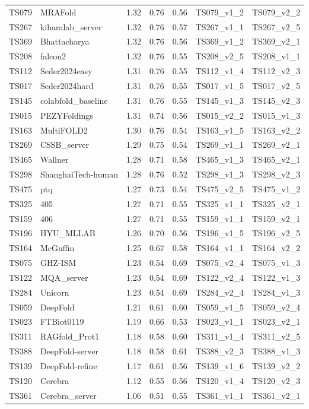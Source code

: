 \begin{table}[ht]
{\begin{tabular}{llrrrll}
TS079 & MRAFold & 1.32 & 0.76 & 0.56 & TS079\_v1\_2 & TS079\_v2\_2 \\ 
TS267 & kiharalab\_server & 1.32 & 0.76 & 0.57 & TS267\_v1\_1 & TS267\_v2\_5 \\ 
TS369 & Bhattacharya & 1.32 & 0.76 & 0.56 & TS369\_v1\_2 & TS369\_v2\_1 \\ 
TS208 & falcon2 & 1.32 & 0.76 & 0.55 & TS208\_v2\_5 & TS208\_v1\_1 \\ 
TS112 & Seder2024easy & 1.31 & 0.76 & 0.55 & TS112\_v1\_4 & TS112\_v2\_3 \\ 
TS017 & Seder2024hard & 1.31 & 0.76 & 0.55 & TS017\_v1\_5 & TS017\_v2\_5 \\ 
TS145 & colabfold\_baseline & 1.31 & 0.76 & 0.55 & TS145\_v1\_3 & TS145\_v2\_3 \\ 
TS015 & PEZYFoldings & 1.31 & 0.74 & 0.56 & TS015\_v2\_2 & TS015\_v1\_3 \\ 
TS163 & MultiFOLD2 & 1.30 & 0.76 & 0.54 & TS163\_v1\_5 & TS163\_v2\_2 \\ 
TS269 & CSSB\_server & 1.29 & 0.75 & 0.54 & TS269\_v1\_1 & TS269\_v2\_1 \\ 
TS465 & Wallner & 1.28 & 0.71 & 0.58 & TS465\_v1\_3 & TS465\_v2\_1 \\ 
TS298 & ShanghaiTech-human & 1.28 & 0.76 & 0.52 & TS298\_v1\_3 & TS298\_v2\_3 \\ 
TS475 & ptq & 1.27 & 0.73 & 0.54 & TS475\_v2\_5 & TS475\_v1\_2 \\ 
TS325 & 405 & 1.27 & 0.71 & 0.55 & TS325\_v1\_1 & TS325\_v2\_1 \\ 
TS159 & 406 & 1.27 & 0.71 & 0.55 & TS159\_v1\_1 & TS159\_v2\_1 \\ 
TS196 & HYU\_MLLAB & 1.26 & 0.70 & 0.56 & TS196\_v1\_5 & TS196\_v2\_5 \\ 
TS164 & McGuffin & 1.25 & 0.67 & 0.58 & TS164\_v1\_1 & TS164\_v2\_2 \\ 
TS075 & GHZ-ISM & 1.23 & 0.54 & 0.69 & TS075\_v2\_4 & TS075\_v1\_3 \\ 
TS122 & MQA\_server & 1.23 & 0.54 & 0.69 & TS122\_v2\_4 & TS122\_v1\_3 \\ 
TS284 & Unicorn & 1.23 & 0.54 & 0.69 & TS284\_v2\_4 & TS284\_v1\_3 \\ 
TS059 & DeepFold & 1.21 & 0.61 & 0.60 & TS059\_v1\_5 & TS059\_v2\_4 \\ 
TS023 & FTBiot0119 & 1.19 & 0.66 & 0.53 & TS023\_v1\_1 & TS023\_v2\_1 \\ 
TS311 & RAGfold\_Prot1 & 1.18 & 0.58 & 0.60 & TS311\_v1\_4 & TS311\_v2\_5 \\ 
TS388 & DeepFold-server & 1.18 & 0.58 & 0.61 & TS388\_v2\_3 & TS388\_v1\_3 \\ 
TS139 & DeepFold-refine & 1.17 & 0.61 & 0.56 & TS139\_v1\_6 & TS139\_v2\_2 \\ 
TS120 & Cerebra & 1.12 & 0.55 & 0.56 & TS120\_v1\_4 & TS120\_v2\_3 \\ 
TS361 & Cerebra\_server & 1.06 & 0.51 & 0.55 & TS361\_v1\_1 & TS361\_v2\_1 \\ 
\bottomrule
\end{tabular}%
}
\end{table}
